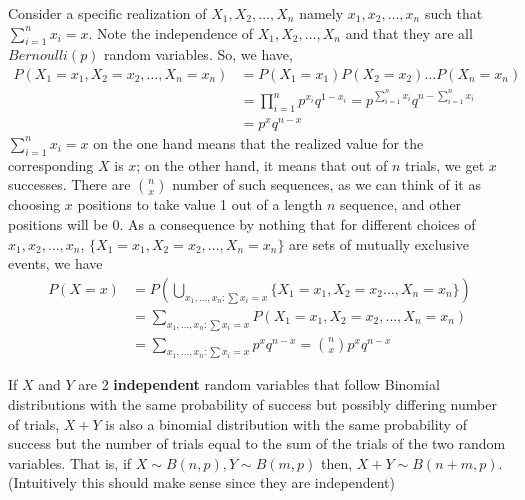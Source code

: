 \begin{note}
\end{note}
Consider a specific realization of $X_1, X_2, \dots, X_n$ namely $x_1, x_2, \dots, x_n$ such that $\sum_{i = 1}^n x_i = x$. Note the independence of $X_1, X_2, \dots, X_n$ and that they are all $Bernoulli(p)$ random variables. So, we have,
\begin{equation*}
\begin{split}
    P(X_1 = x_1, X_2 = x_2, \dots, X_n = x_n) &= P(X_1 = x_1)P(X_2 = x_2)\dots P(X_n = x_n) \\
    &= \prod_{i = 1}^{n} p^{x_i}q^{1-x_i} = p^{\sum_{i = 1}^n x_i} q^{n -\sum_{i = 1}^n x_i } \\
    &= p^x q^{n - x}
\end{split}
\end{equation*}
$\sum_{i = 1}^n x_i = x$ on the one hand means that the realized value for the corresponding $X$ is $x$; on the other hand, it means that out of $n$ trials, we get $x$ successes. There are $\binom{n}{x}$ number of such sequences, as we can think of it as choosing $x$ positions to take value 1 out of a length $n$ sequence, and other positions will be 0. As a consequence by nothing that for different choices of $x_1, x_2, \dots , x_n$, $\{X_1 = x_1, X_2 = x_2, \dots , X_n = x_n\}$ are sets of mutually exclusive events, we have
\begin{equation*}
    \begin{split}
        P(X = x) &= P\left( \bigcup_{x_1, \dots, x_n : \sum x_i = x} \{X_1 = x_1, X_2 = x_2 \dots, X_n = x_n \} \right) \\
        &= \sum_{x_1, \dots, x_n : \sum x_i = x} P(X_1 = x_1, X_2 = x_2, \dots, X_n = x_n) \\
        &= \sum_{x_1, \dots, x_n : \sum x_i = x} p^x q^{n-x} = \binom{n}{x}p^x q^{n-x}
    \end{split}
\end{equation*}
\begin{note}
\end{note}
If $X$ and $Y$ are 2 \textbf{independent} random variables that follow Binomial distributions with the same probability of success but possibly differing number of trials, $X + Y$ is also a binomial distribution with the same probability of success but the number of trials equal to the sum of the trials of the two random variables. That is, if $X \sim B(n,p), Y \sim B(m,p)$ then, $ X + Y \sim B(n + m, p)$. (Intuitively this should make sense since they are independent)
